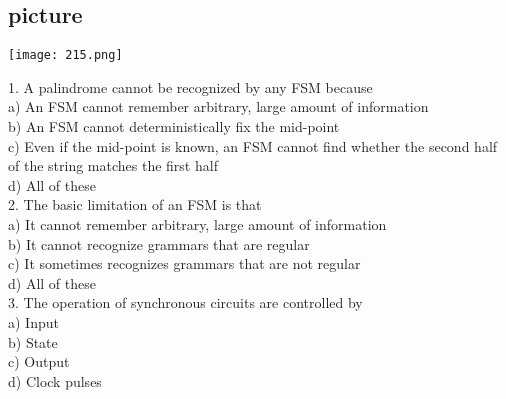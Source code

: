 \documentclass[8pt]{beamer}
\begin{document}
\begin{frame}
\begin{center}
\section{picture}
\texttt{[image: 215.png]}
\end{center}

\begin{multicols}{2}
1. A palindrome cannot be recognized by any
FSM because\\
\hspace*{0.4cm} a) An FSM cannot remember arbitrary,
large amount of information\\
\hspace*{0.4cm} b) An FSM cannot deterministically fix
the mid-point\\
\hspace*{0.4cm} c) Even if the mid-point is known, an
FSM cannot find whether the second
half of the string matches the first half\\
\hspace*{0.4cm} d) All of these\\

\vspace*{0.3cm}
2. The basic limitation of an FSM is that\\
\hspace*{0.4cm} a) It cannot remember arbitrary, large
amount of information\\
\hspace*{0.4cm} b) It cannot recognize grammars that are
regular\\
\hspace*{0.4cm} c) It sometimes recognizes grammars that
are not regular\\
\hspace*{0.4cm} d) All of these\\

\vspace*{0.3cm} 
3. The operation of synchronous circuits are
controlled by\\
\hspace*{0.4cm} a) Input\\
\hspace*{0.4cm} b) State\\
\hspace*{0.4cm} c) Output\\
\hspace*{0.4cm} d) Clock pulses\\


\end{multicols}
\end{frame}
\end{document}
